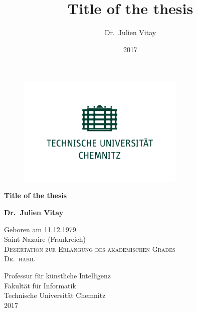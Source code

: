 \documentclass[
  11pt,
  a4paper,
]{scrbook}
\title{Title of the thesis}
\author{Dr.~Julien Vitay}
\date{2017}
\begin{document}
    \frontmatter


    \cleardoublepage
    \thispagestyle{empty}

    {\centering

        \begin{figure}[h!]
            \begin{center}
                \includegraphics[width=8cm]{img/tuc.png}
            \end{center}
        \end{figure}
        
        \vfill

        {\Huge\bfseries Title of the
thesis\\[5pt] } %
        
        
        \vspace{1.5cm}

                    {\LARGE\bfseries Dr.~Julien Vitay}\\[5pt]
        
        \vspace{1cm}

        
                { Geboren am 11.12.1979} \\[5pt]
                { Saint-Nazaire (Frankreich)} \\[5pt]
        
                    \vspace{1cm}
                        \textsc{Dissertation zur Erlangung des
akademischen Grades} \\[1cm]
                        \textsc{\Large{{Dr.~habil}}} \\[5pt] %
                
        \vfill

                    {Professur für künstliche
Intelligenz}\\[5pt] %
                            {Fakultät für
Informatik}\\[5pt] %
                            {Technische Universität
Chemnitz}\\[5pt] %
        
        \vfill
                    {2017} %
        
        
    }
\end{document}
